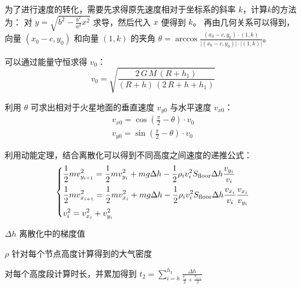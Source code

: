 \documentclass[hyperref,a4paper,UTF8]{ctexart}
\begin{document}
为了进行速度的转化，需要先求得原先速度相对于坐标系的斜率 $k$，计算$k$的方法为：
对 $y = \sqrt{b^2 - \frac{b^2}{a^2}x^2}$ 求导，然后代入 $x$ 便得到 $k$。
再由几何关系可以得到，向量 $(x_0 - c, y_0)$ \smallskip 和向量 $(1,k)$ 的夹角 $\theta = \arccos
    \frac{\displaystyle (x_0 - c, y_0)·(1,k)}{\displaystyle\vert (x_0 - c, y_0)\vert \cdot |(1,k)|} $。

\smallskip
可以通过能量守恒求得 $v_0$：
\[
    v_0 = \sqrt{\frac{2\,G\,M\,{\left(R+h_1 \right)}}
        {{\left(R+h\right)}\,{\left(2\,R+h+h_1 \right)}}}
\]

利用 $\theta $ 可求出相对于火星地面的垂直速度 $v_{y0}$ 与水平速度 $v_{x0}$：
\begin{gather*}
    v_{x0} = \cos (\frac{\pi }{2} - \theta ) \cdot v_0 \\
    v_{y0} = \sin (\frac{\pi }{2} - \theta ) \cdot v_0
\end{gather*}

利用动能定理，结合离散化可以得到不同高度之间速度的递推公式：
\begin{equation}\label{eq:atmos}
    \begin{dcases}
        \frac{1}{2}mv_{y_{i + 1}}^2 = \frac{1}{2}mv_{y_{i}}^2 + mg\Delta h -
        \frac{1}{2}\rho _iv_i^2S_{\text{floor}}\Delta h\frac{v_{y_i}}{v_i}                        \\
        \frac{1}{2}mv_{x_{i + 1}}^2 = \frac{1}{2}mv_{x_{i}}^2 + mg\Delta h -
        \frac{1}{2}\rho _iv_i^2S_{\text{floor}}\Delta h\frac{v_{x_i}}{v_i}\frac{v_{x_i}}{v_{y_i}} \\
        v_i^2 = v_{x_i}^2 + v_{y_i}^2
    \end{dcases}
\end{equation}
\begin{eqexpl}[0mm]
    \item{$\Delta h$} 离散化中的梯度值
    \item{$\rho$} 针对每个节点高度计算得到的大气密度
\end{eqexpl}
\smallskip

对每个高度段计算时长，并累加得到
$
    \displaystyle t_2=\sum_{i=h}^{h_3}{\displaystyle\frac{\Delta h}{\frac{\displaystyle v_i}
        {\displaystyle 2}+\frac{\displaystyle v_{\textrm{i+1}} }{\displaystyle 2}}}
$
\end{document}

